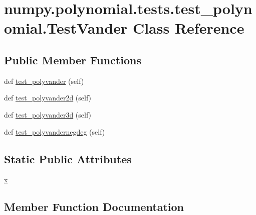 \hypertarget{classnumpy_1_1polynomial_1_1tests_1_1test__polynomial_1_1TestVander}{}\section{numpy.\+polynomial.\+tests.\+test\+\_\+polynomial.\+Test\+Vander Class Reference}
\label{classnumpy_1_1polynomial_1_1tests_1_1test__polynomial_1_1TestVander}
\subsection*{Public Member Functions}
\begin{DoxyCompactItemize}
\item 
def \hyperlink{classnumpy_1_1polynomial_1_1tests_1_1test__polynomial_1_1TestVander_a8958a1d06940c5f88fbbd563e480a353}{test\+\_\+polyvander} (self)
\item 
def \hyperlink{classnumpy_1_1polynomial_1_1tests_1_1test__polynomial_1_1TestVander_aa7cd9f2ee5c42fd67941d0a78b8a4a0b}{test\+\_\+polyvander2d} (self)
\item 
def \hyperlink{classnumpy_1_1polynomial_1_1tests_1_1test__polynomial_1_1TestVander_a18a7c2cd7774775539881e999a8b49c3}{test\+\_\+polyvander3d} (self)
\item 
def \hyperlink{classnumpy_1_1polynomial_1_1tests_1_1test__polynomial_1_1TestVander_a522bbe4884c70a3cfc40312b16898479}{test\+\_\+polyvandernegdeg} (self)
\end{DoxyCompactItemize}
\subsection*{Static Public Attributes}
\begin{DoxyCompactItemize}
\item 
\hyperlink{classnumpy_1_1polynomial_1_1tests_1_1test__polynomial_1_1TestVander_a040db43ccaafe6f3b6b1e856b5425034}{x}
\end{DoxyCompactItemize}


\subsection{Member Function Documentation}
\mbox{\label{classnumpy_1_1polynomial_1_1tests_1_1test__polynomial_1_1TestVander_a8958a1d06940c5f88fbbd563e480a353}} 

